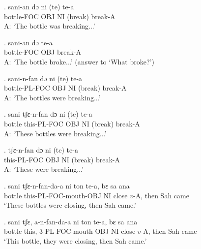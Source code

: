 \documentclass{assets/fieldnotes}
\begin{document}
\exg.
sani-an      dɔ    ni   (te)      te-a    \\
bottle-FOC   OBJ   NI   (break)   break-A \\%
A: `The bottle was breaking...' \label{67927}


\exg.
sani-an      dɔ    te-a    \\
bottle-FOC   OBJ   break-A \\%
A: `The bottle broke...' (answer to `What broke?')

\exg.
sani-n-fan      dɔ    ni   (te)      te-a    \\
bottle-PL-FOC   OBJ   NI   (break)   break-A \\%
A: `The bottles were breaking...' \label{42653}

\exg.
sani     tʃɛ-n-fan     dɔ    ni   (te)      te-a    \\
bottle   this-PL-FOC   OBJ   NI   (break)   break-A \\%
A: `These bottles were breaking...'

\exg.
tʃɛ-n-fan     dɔ    ni   (te)      te-a    \\
this-PL-FOC   OBJ   NI   (break)   break-A \\%
A: `These were breaking...' \label{27512}

\exg.
sani     tʃɛ-n-fan-da-a          ni   ton     te-a,    bɛ     sa    ana  \\
bottle   this-PL-FOC-mouth-OBJ   NI   close   $v$-A,   then   Sah   came \\%
`These bottles were closing, then Sah came.' \label{34876}


\exg.
sani     tʃɛ,    a-n-fan-da-a         ni   ton     te-a,    bɛ     sa    ana  \\
bottle   this,   3-PL-FOC-mouth-OBJ   NI   close   $v$-A,   then   Sah   came \\%
`This bottle, they were closing, then Sah came.' \label{42253}
\end{document}
